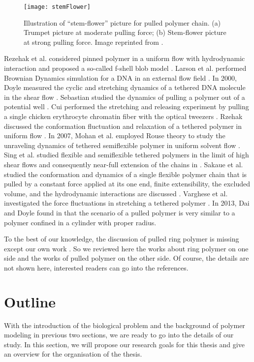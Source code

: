 \begin{figure}[htpb]
    \centering
    \texttt{[image: stemFlower]}
    \caption{Illustration of ``stem-flower'' picture for pulled polymer chain. (a) Trumpet picture at moderate pulling force; (b) Stem-flower picture at strong pulling force. Image reprinted from \cite{Brochard-Wyart1995}.}
    \label{fig:stemFlower}
\end{figure}


Rezehak et al. considered pinned polymer in a uniform flow with hydrodynamic interaction and proposed a so-called f-shell blob model \cite{Rzehak1999}. Larson et al. performed Brownian Dynamics simulation for a DNA in an external flow field \cite{Larson1999}. In 2000, Doyle measured the cyclic and stretching dynamics of a tethered DNA molecule in the shear flow \cite{Doyle2000, Ladoux2000a}. Sebastian studied the dynamics of pulling a polymer out of a potential well \cite{Sebastian2000}. Cui performed the stretching and releasing experiment by pulling a single chicken erythrocyte chromatin fiber with the optical tweezers \cite{Cui2000a}. Rzehak discussed the conformation fluctuation and relaxation of a tethered polymer in uniform flow \cite{Rzehak2003a}. In 2007, Mohan et al. employed Rouse theory to study the unraveling dynamics of tethered semiflexible polymer in uniform solvent flow \cite{Mohan2007}. Sing et al. studied flexible and semiflexible tethered polymers in the limit of high shear flows and consequently near-full extension of the chains in \cite{Sing2011}.  Sakaue et al. studied the conformation and dynamics of a single flexible polymer chain that is pulled by a constant force applied at its one end, finite extensibility, the excluded volume, and the hydrodynamic interactions are discussed \cite{Sakaue2012a}.  Varghese et al. investigated the force fluctuations in stretching a tethered polymer \cite{Varghese2013}.
In 2013, Dai and Doyle found in \cite{Dai2013a} that the scenario of a pulled polymer is very similar to a polymer confined in a cylinder with proper radius.

To the best of our knowledge, the discussion of pulled ring polymer is missing except our own work \cite{Lin2015}. So we reviewed here the works about ring polymer on one side and the works of pulled polymer on the other side. Of course, the details are not shown here, interested readers can go into the references.

\section{Outline}  %
\label{sec:outline}
With the introduction of the biological problem and the background of polymer modeling in previous two sections, we are ready to go into the details of our study. In this section, we will propose our research goals for this thesis and give an overview for the organisation of the thesis.


